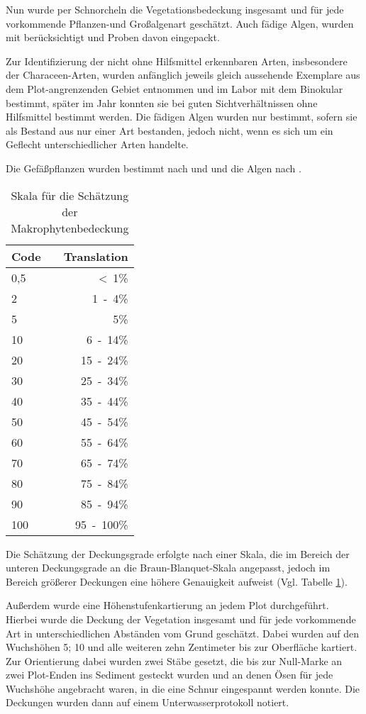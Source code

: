 Nun wurde per Schnorcheln die Vegetationsbedeckung insgesamt und für jede vorkommende Pflanzen-und Großalgenart geschätzt. Auch fädige Algen, wurden mit berücksichtigt und Proben davon eingepackt. 

Zur Identifizierung der nicht ohne Hilfsmittel erkennbaren Arten, insbesondere der Characeen-Arten, wurden anfänglich jeweils gleich aussehende Exemplare aus dem Plot-angrenzenden Gebiet entnommen und im Labor mit dem Binokular bestimmt, später im Jahr konnten sie bei guten Sichtverhältnissen ohne Hilfsmittel bestimmt werden. Die fädigen Algen wurden nur bestimmt, sofern sie als Bestand aus nur einer Art bestanden, jedoch nicht, wenn es sich um ein Geflecht unterschiedlicher Arten handelte.

Die Gefäßpflanzen wurden bestimmt nach \cite{van_de_weyer_2007} und \cite{rothmaler_2005} und die Algen nach \cite{pankow_1971}.


\begin{table}[h]
\centering
\caption{Skala für die Schätzung der Makrophytenbedeckung}
\begin{tabular}{llr}
\toprule
Code	&& Translation\\
\midrule
0,5	 	&& \unit{<1}{\%} \\
2 		&& \unit{1-4}{\%} \\
5 		&& \unit{5}{\%}\\
\midrule
10 		&& \unit{6-14}{\%}\\
20 		&& \unit{15-24}{\%}\\
30 		&& \unit{25-34}{\%}\\
40		&& \unit{35-44}{\%}\\
50		&& \unit{45-54}{\%}\\
\midrule
60		&& \unit{55-64}{\%}\\
70		&& \unit{65-74}{\%}\\
80		&& \unit{75-84}{\%}\\
90		&& \unit{85-94}{\%}\\
100		&& \unit{95-100}{\%}\\
\bottomrule
\end{tabular}
\label{Deckung}
\end{table}



Die Schätzung der Deckungsgrade erfolgte nach einer Skala, die im Bereich der unteren Deckungsgrade an die Braun-Blanquet-Skala angepasst, jedoch im Bereich größerer Deckungen eine höhere Genauigkeit aufweist (Vgl. Tabelle \ref{Deckung}).

Außerdem wurde eine Höhenstufenkartierung an jedem Plot durchgeführt. Hierbei wurde die Deckung der Vegetation insgesamt und für jede vorkommende Art in unterschiedlichen Abständen vom Grund geschätzt. Dabei wurden auf den Wuchshöhen \unit{5}{\centi\metre}; \unit{10}{\centi\metre} und alle weiteren zehn Zentimeter bis zur Oberfläche kartiert. Zur Orientierung dabei wurden zwei Stäbe gesetzt, die bis zur Null-Marke an zwei Plot-Enden ins Sediment gesteckt wurden und an denen Ösen für jede Wuchshöhe angebracht waren, in die eine Schnur eingespannt werden konnte. Die Deckungen wurden dann auf einem Unterwasserprotokoll notiert.






